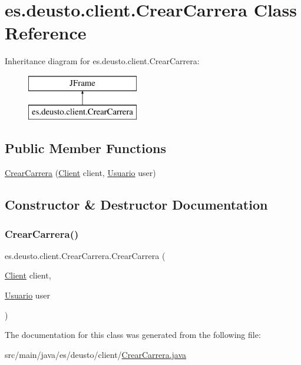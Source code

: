 \hypertarget{classes_1_1deusto_1_1client_1_1_crear_carrera}{}\section{es.\+deusto.\+client.\+Crear\+Carrera Class Reference}
\label{classes_1_1deusto_1_1client_1_1_crear_carrera}
Inheritance diagram for es.\+deusto.\+client.\+Crear\+Carrera\+:\begin{figure}[H]
\begin{center}
\leavevmode
\includegraphics[height=2.000000cm]{classes_1_1deusto_1_1client_1_1_crear_carrera}
\end{center}
\end{figure}
\subsection*{Public Member Functions}
\begin{DoxyCompactItemize}
\item 
\mbox{\hyperlink{classes_1_1deusto_1_1client_1_1_crear_carrera_ab7396c374d289ed38a61d07e6787c43b}{Crear\+Carrera}} (\mbox{\hyperlink{classes_1_1deusto_1_1client_1_1_client}{Client}} client, \mbox{\hyperlink{classes_1_1deusto_1_1server_1_1jdo_1_1_usuario}{Usuario}} user)
\end{DoxyCompactItemize}


\subsection{Constructor \& Destructor Documentation}
\mbox{\label{classes_1_1deusto_1_1client_1_1_crear_carrera_ab7396c374d289ed38a61d07e6787c43b}} 
\subsubsection{\texorpdfstring{CrearCarrera()}{CrearCarrera()}}
{\footnotesize\ttfamily es.\+deusto.\+client.\+Crear\+Carrera.\+Crear\+Carrera (\begin{DoxyParamCaption}\item[{\mbox{\hyperlink{classes_1_1deusto_1_1client_1_1_client}{Client}}}]{client,  }\item[{\mbox{\hyperlink{classes_1_1deusto_1_1server_1_1jdo_1_1_usuario}{Usuario}}}]{user }\end{DoxyParamCaption})}



The documentation for this class was generated from the following file\+:\begin{DoxyCompactItemize}
\item 
src/main/java/es/deusto/client/\mbox{\hyperlink{_crear_carrera_8java}{Crear\+Carrera.\+java}}\end{DoxyCompactItemize}

